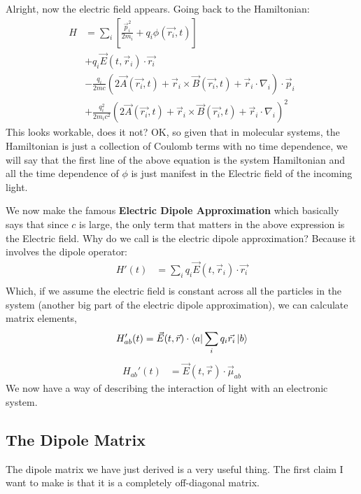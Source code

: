 Alright, now the electric field appears.  Going back to the Hamiltonian:
\begin{align*}
	H &= \sum_i \left[ \frac{\vec{p}_i^2}{2 m_i} + q_i \phi(\vec{r_i}, t) \right] \\
	  &+ q_i \vec{E}(t, \vec{r}_i) \cdot \vec{r_i} \\
	  &- \frac{q_i}{2 m c} \left( 2 \vec{A}(\vec{r_i}, t) +  \vec{r}_i \times \vec{B}(\vec{r_i}, t)  + \vec{r}_i \cdot \nabla_i \right)\cdot \vec{p}_i  \\
	  &+ \frac{q_i^2 }{2 m_i c^2} \left( 2 \vec{A}(\vec{r_i}, t) +  \vec{r}_i \times \vec{B}(\vec{r_i}, t)  + \vec{r}_i \cdot \nabla_i \right)^2
\end{align*}
This looks workable, does it not?  OK, so given that in molecular systems, the Hamiltonian is just a collection of Coulomb terms with no time dependence, we will say that the first line of the above equation is the system Hamiltonian and all the time dependence of $\phi$ is just manifest in the Electric field of the incoming light.

We now make the famous \textbf{Electric Dipole Approximation} which basically says that since $c$ is large, the only term that matters in the above expression is the Electric field.  Why do we call is the electric dipole approximation?  Because it involves the dipole operator:
\begin{align*}
	H'(t) &=  \sum_i q_i \vec{E}(t, \vec{r}_i) \cdot \vec{r_i} \\
\end{align*}
Which, if we assume the electric field is constant across all the particles in the system (another big part of the electric dipole approximation), we can calculate matrix elements,
\begin{align*}
	H_{ab}'(t) &= \vec{E}(t, \vec{r}) \cdot \bra{a} \sum_i q_i  \vec{r_i} \ket{b}\\
\end{align*}
\begin{align}
	H_{ab}'(t) &= \vec{E}(t, \vec{r}) \cdot \vec{\mu}_{ab}
\end{align}
We now have a way of describing the interaction of light with an electronic system.
\subsection{The Dipole Matrix}
The dipole matrix we have just derived is a very useful thing.  The first claim I want to make is that it is a completely off-diagonal matrix.
